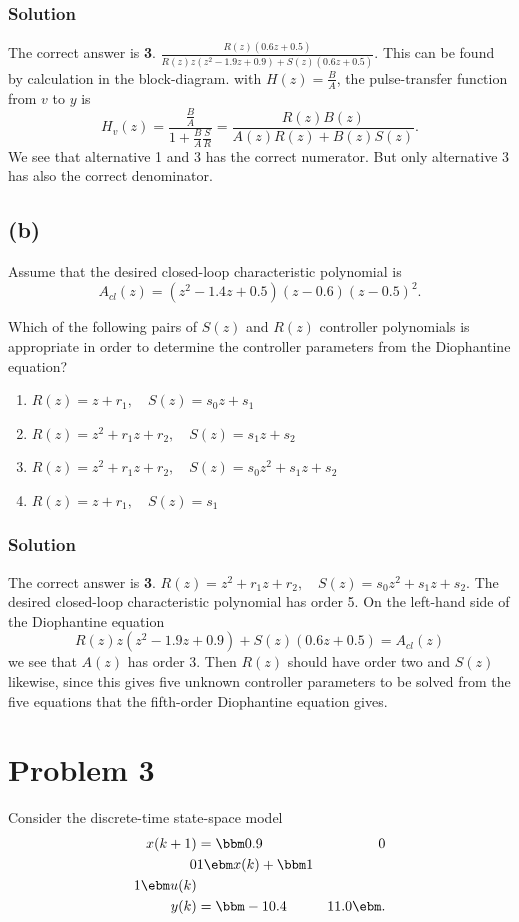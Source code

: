 \documentclass[a4paper]{scrartcl}
\begin{document}
\subsubsection*{Solution}
\label{sec-2-1-1}
The correct answer is \textbf{3}. \(\frac{R(z) \left(0.6 z + 0.5\right)}{R(z) z \left(z^{2} - 1.9 z + 0.9\right) + S(z) \left(0.6 z + 0.5\right)}\). This can be found by calculation in the block-diagram. with $H(z) = \frac{B}{A}$, the pulse-transfer function from $v$ to $y$ is
\[ H_v(z) = \frac{\frac{B}{A}}{1 + \frac{B}{A}\frac{S}{R}} = \frac{R(z)B(z)}{A(z)R(z) + B(z)S(z)}. \]
We see that alternative 1 and 3 has the correct numerator. But only alternative 3 has also the correct denominator.

\subsection*{(b)}
\label{sec-2-2}
Assume that the desired closed-loop characteristic polynomial is
\[ A_{cl}(z) = (z^2 - 1.4z + 0.5)(z-0.6)(z-0.5)^2. \]

Which of the following pairs of $S(z)$ and $R(z)$ controller polynomials is appropriate in order to determine the controller parameters from the Diophantine equation?
\begin{enumerate}
\item \(R(z) = z + r_1, \quad S(z) = s_0z + s_1 \)
\item \(R(z) = z^2 + r_1z + r_2, \quad S(z) = s_1z + s_2 \)
\item \(R(z) = z^2 + r_1z + r_2, \quad S(z) = s_0z^2 + s_1z + s_2 \)
\item \(R(z) = z + r_1, \quad S(z) = s_1 \)
\end{enumerate}

\subsubsection*{Solution}
\label{sec-2-2-1}
The correct answer is \textbf{3}.  \(R(z) = z^2 + r_1z + r_2, \quad S(z) = s_0z^2 + s_1z + s_2 \). The desired closed-loop characteristic polynomial has order 5. On the left-hand side of the Diophantine equation 
\[ R(z) z \left(z^{2} - 1.9 z + 0.9\right) + S(z) \left(0.6 z + 0.5\right) = A_{cl}(z) \]
we see that $A(z)$ has order 3. Then $R(z)$ should have order two and $S(z)$ likewise, since this gives five unknown controller parameters to be solved from the five equations that the fifth-order Diophantine equation gives. 

\section*{Problem 3}
\label{sec-3}
Consider the discrete-time state-space model
 \begin{equation*}
 \begin{split}
  x(k+1) &= \bbm 0.9 & 0\\0 & 1\ebm x(k) + \bbm 1\\1 \ebm u(k)\\
  y(k) &= \bbm -10.4 & 11.0 \ebm.
 \end{split}
\end{equation*}
\end{document}
